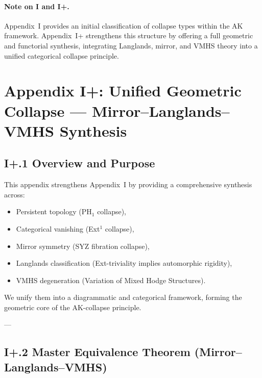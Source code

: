 \documentclass[11pt]{article}
\begin{document}
\paragraph{Note on I and I+.}
Appendix~I provides an initial classification of collapse types within the AK framework.  
Appendix~I+ strengthens this structure by offering a full geometric and functorial synthesis, integrating Langlands, mirror, and VMHS theory into a unified categorical collapse principle.



\section*{Appendix I+: Unified Geometric Collapse — Mirror–Langlands–VMHS Synthesis}

\subsection*{I+.1 Overview and Purpose}

This appendix strengthens Appendix~I by providing a comprehensive synthesis across:
\begin{itemize}
  \item Persistent topology (PH$_1$ collapse),
  \item Categorical vanishing (Ext$^1$ collapse),
  \item Mirror symmetry (SYZ fibration collapse),
  \item Langlands classification (Ext-triviality implies automorphic rigidity),
  \item VMHS degeneration (Variation of Mixed Hodge Structures).
\end{itemize}

We unify them into a diagrammatic and categorical framework, forming the geometric core of the AK-collapse principle.

---

\subsection*{I+.2 Master Equivalence Theorem (Mirror–Langlands–VMHS)}
\end{document}
